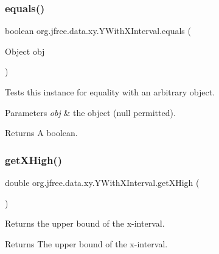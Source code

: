 \subsubsection{\texorpdfstring{equals()}{equals()}}
{\footnotesize\ttfamily boolean org.\+jfree.\+data.\+xy.\+Y\+With\+X\+Interval.\+equals (\begin{DoxyParamCaption}\item[{Object}]{obj }\end{DoxyParamCaption})}

Tests this instance for equality with an arbitrary object.


\begin{DoxyParams}{Parameters}
{\em obj} & the object ({\ttfamily null} permitted).\\
\hline
\end{DoxyParams}
\begin{DoxyReturn}{Returns}
A boolean. 
\end{DoxyReturn}
\mbox{\label{classorg_1_1jfree_1_1data_1_1xy_1_1_y_with_x_interval_a3e0afb19bd6871d133b25483bcf60ae9}} 
\subsubsection{\texorpdfstring{get\+X\+High()}{getXHigh()}}
{\footnotesize\ttfamily double org.\+jfree.\+data.\+xy.\+Y\+With\+X\+Interval.\+get\+X\+High (\begin{DoxyParamCaption}{ }\end{DoxyParamCaption})}

Returns the upper bound of the x-\/interval.

\begin{DoxyReturn}{Returns}
The upper bound of the x-\/interval. 
\end{DoxyReturn}
\mbox{\label{classorg_1_1jfree_1_1data_1_1xy_1_1_y_with_x_interval_af30ba169f4a9543716540d1cde171fc1}} 
